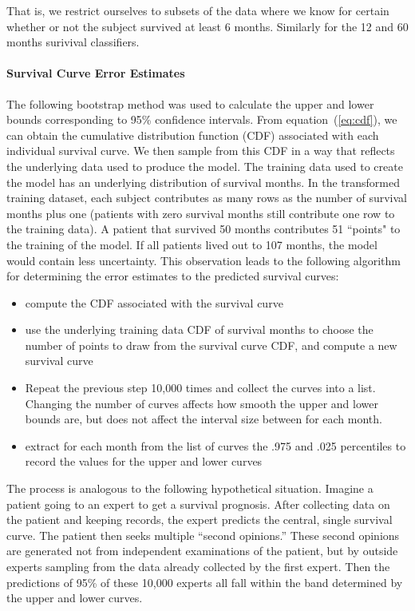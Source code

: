 \documentclass[10pt,letterpaper]{article}
\begin{document}
That is, we restrict ourselves to subsets of the data where we know for certain whether or not the subject survived at least 6 months. Similarly for the 12 and 60 months surivival classifiers. 

\paragraph{Survival Curve Error Estimates}
The following bootstrap method was used to calculate the upper and lower bounds corresponding to 95\% confidence intervals.
From equation~(\ref{eq:cdf}), we can obtain the cumulative distribution function (CDF) associated with each individual survival curve.
We then sample from this CDF in a way that reflects the underlying data used to produce the model. The training data used to create the model has an underlying distribution of survival months. In the transformed training dataset, each subject contributes as many rows as the number of survival months plus one (patients with zero survival months still contribute one row to the training data). A patient that survived 50 months contributes 51 ``points" to the training of the model. If all patients lived out to 107 months, the model would contain less uncertainty. This observation leads to the following algorithm for determining the error estimates to the predicted survival curves:

\begin{itemize}[noitemsep]
\item compute the CDF associated with the survival curve
\item use the underlying training data CDF of survival months to choose the number of points
to draw from the survival curve CDF, and compute a new survival curve 
\item Repeat the previous step 10,000 times and collect the curves into a list. Changing the number of curves affects how smooth the upper and lower bounds are, but does not affect the interval size between for each month.
\item extract for each month from the list of curves the .975 and .025 percentiles to record the values for the upper and lower curves
\end{itemize}

The process is analogous to the following hypothetical situation. Imagine a patient going to an expert to get a survival prognosis.
After collecting data on the patient and keeping records, the expert predicts the central, single survival curve. The patient then seeks multiple ``second opinions.'' These second opinions are generated not from independent examinations of the patient, but by outside experts sampling from the data already collected by the first expert.
Then the predictions of 95\% of these 10,000 experts all fall within the band determined by the upper and lower curves.
\end{document}
